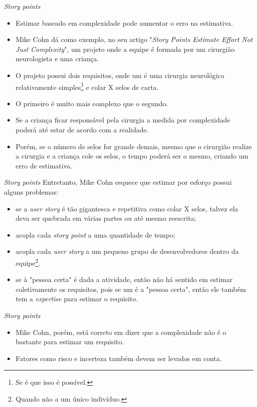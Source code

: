 \documentclass[11pt]{beamer}
\begin{document}
    \begin{frame}{\textit{Story points}}
        \begin{itemize}
            \item Estimar baseado em complexidade pode aumentar o erro na estimativa.
            \item Mike Cohn dá como exemplo, no seu artigo "\textit{Story Points Estimate Effort Not Just Complexity}", um projeto onde a equipe é formada por um cirurgião neurologista e uma criança.
            \item O projeto possui dois requisitos, onde um é uma cirurgia neurológica relativamente simples\footnote{Se é que isso é possível.} e colar X selos de carta.
            \item O primeiro é muito mais complexo que o segundo.
            \item Se a criança ficar responsável pela cirurgia a medida por complexidade poderá até estar de acordo com a realidade.
            \item Porém, se o número de selos for grande demais, mesmo que o cirurgião realize a cirurgia e a criança cole os selos, o tempo poderá ser o mesmo, criando um erro de estimativa.
        \end{itemize}
    \end{frame}

    \begin{frame}{\textit{Story points}}
        Entretanto, Mike Cohn esquece que estimar por esforço possui alguns problemas:
        \begin{itemize}
            \item se a \textit{user story} é tão gigantesca e repetitiva como colar X selos, talvez ela deva ser quebrada em várias partes ou até mesmo reescrita;
            \item acopla cada \textit{story point} a uma quantidade de tempo;
            \item acopla cada \textit{user story} a um pequeno grupo de desenvolvedores dentro da equipe\footnote{Quando não a um único indivíduo.}.
            \item se à "pessoa certa" é dada a atividade, então não há sentido em estimar coletivamente os requisitos, pois se um é a "pessoa certa", então ele também tem a \textit{expertise} para estimar o requisito.
        \end{itemize}
    \end{frame}

    \begin{frame}{\textit{Story points}}
        \begin{itemize}
            \item Mike Cohn, porém, está correto em dizer que a complexidade não é o bastante para estimar um requisito.
            \item Fatores como risco e incerteza também devem ser levados em conta.
        \end{itemize}
    \end{frame}
\end{document}
